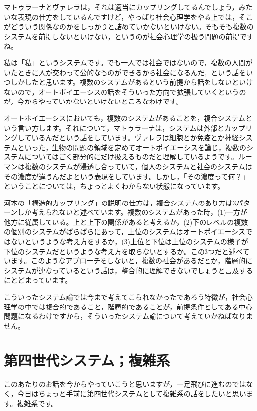 \documentclass{ltjsbook}
\begin{document}
マトゥラーナとヴァレラは，それは適当にカップリングしてるんでしょう，みたいな表現の仕方をしているんですけど，やっぱり社会心理学をやる上では，そこがどういう関係なのかをしっかりと詰めていかないといけない。そもそも複数のシステムを前提しないといけない，というのが社会心理学の扱う問題の前提ですね。

私は「私」というシステムです。でも一人では社会ではないので，複数の人間がいたときに人が交わって公的なものができるから社会になるんだ，という話をいつしかしたと思います。複数のシステムがあるという前提から話をしないといけないので，オートポイエーシスの話をそういった方向で拡張していくというのが，今からやっていかないといけないところなわけです。

オートポイエーシスにおいても，複数のシステムがあることを，複合システムという言い方します。それについて，マトゥラーナは，システムは外部とカップリングしているんだという話をしています。ヴァレラは細胞とか免疫とか神経システムといった，生物の問題の領域を定めてオートポイエーシスを論じ，複数のシステムについてはごく部分的にだけ扱えるものだと理解しているようです。ルーマンは複数のシステムが浸透し合っていて，個人のシステムと社会のシステムはその濃度が違うんだよという表現をしています。しかし，「その濃度って何？」ということについては，ちょっとよくわからない状態になっています。

河本\parencite{KawamotoHideo}の「構造的カップリング」の説明の仕方は，複合システムのあり方は3パターンしか考えられないと述べています。複数のシステムがあった時，(1)一方が他方に従属している。上と上下の関係があると考えるか，(2)下のレベルの複数の個別のシステムがばらばらにあって，上位のシステムはオートポイエーシスではないというような考え方をするか，(3)上位と下位は上位のシステムの様子が下位のシステムだというような考え方を取らないとするか。この3つだと述べています。このようなアプローチをしないと，複数の社会があるだとか，階層的にシステムが連なっているという話は，整合的に理解できないでしょうと言及するにとどまっています。

こういったシステム論では今まで考えてこられなかったであろう特徴が，社会心理学の中では複合的であること，階層的であることが，前提条件としてある中心問題になるわけですから，そういったシステム論について考えていかねばなりません。

\section{第四世代システム；複雑系}

このあたりのお話を今からやっていこうと思いますが，一足飛びに進むのではなく，今日はちょっと手前に第四世代システムとして複雑系の話をしたいと思います。複雑系です。
\end{document}
